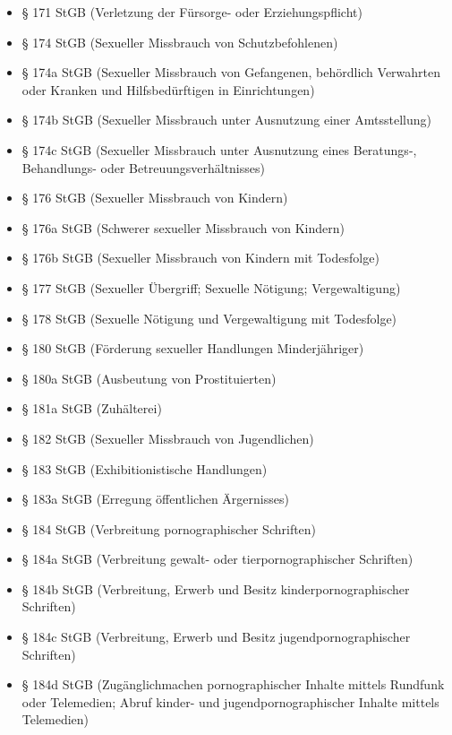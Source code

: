 \documentclass[11pt]{article}
\begin{document}
\begin{Form}
    \begin{itemize}[itemsep=-0.1cm]
        \small
        \item § 171 StGB (Verletzung der Fürsorge- oder Erziehungspflicht)
        \item § 174 StGB (Sexueller Missbrauch von Schutzbefohlenen)
        \item § 174a StGB (Sexueller Missbrauch von Gefangenen, behördlich Verwahrten oder Kranken und Hilfsbedürftigen in Einrichtungen)
        \item § 174b StGB (Sexueller Missbrauch unter Ausnutzung einer Amtsstellung)
        \item § 174c StGB (Sexueller Missbrauch unter Ausnutzung eines Beratungs-, Behandlungs- oder Betreuungsverhältnisses)
        \item § 176 StGB (Sexueller Missbrauch von Kindern)
        \item § 176a StGB (Schwerer sexueller Missbrauch von Kindern)
        \item § 176b StGB (Sexueller Missbrauch von Kindern mit Todesfolge)
        \item § 177 StGB (Sexueller Übergriff; Sexuelle Nötigung; Vergewaltigung)
        \item § 178 StGB (Sexuelle Nötigung und Vergewaltigung mit Todesfolge)
        \item § 180 StGB (Förderung sexueller Handlungen Minderjähriger)
        \item § 180a StGB (Ausbeutung von Prostituierten)
        \item § 181a StGB (Zuhälterei)
        \item § 182 StGB (Sexueller Missbrauch von Jugendlichen)
        \item § 183 StGB (Exhibitionistische Handlungen)
        \item § 183a StGB (Erregung öffentlichen Ärgernisses)
        \item § 184 StGB (Verbreitung pornographischer Schriften)
        \item § 184a StGB (Verbreitung gewalt- oder tierpornographischer Schriften)
        \item § 184b StGB (Verbreitung, Erwerb und Besitz kinderpornographischer Schriften)
        \item § 184c StGB (Verbreitung, Erwerb und Besitz jugendpornographischer Schriften)
        \item § 184d StGB (Zugänglichmachen pornographischer Inhalte mittels Rundfunk oder Telemedien; Abruf kinder- und jugendpornographischer Inhalte mittels Telemedien)

\end{itemize}
\end{Form}
\end{document}
